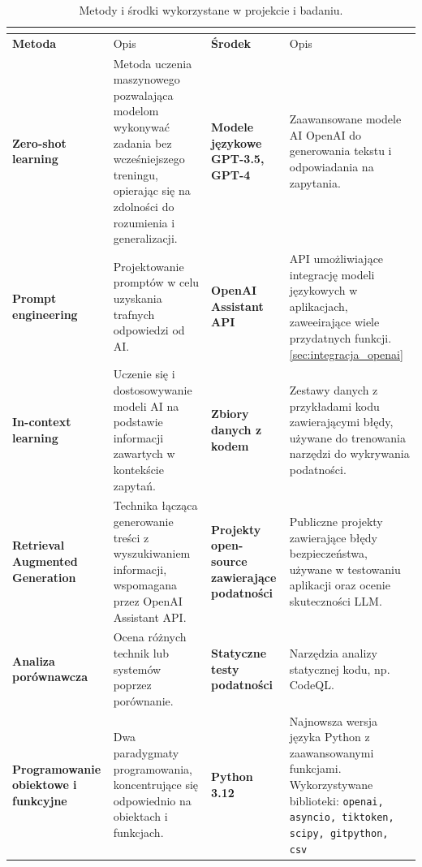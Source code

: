 \begin{table}[H]
    \caption{Metody i środki wykorzystane w projekcie i badaniu.}
    \begin{adjustwidth}{-2cm}{-2cm}  %
        \centering
    \begin{tabular}{|>{\bfseries}p{2.7cm}|p{5cm}|>{\bfseries}p{2.5cm}|p{5cm}|}
    \hline
    \multicolumn{4}{|c|}{\textbf{Metody i Środki}} \\
    \hline
    \textbf{Metoda} & \small{Opis} & \textbf{Środek} & \small{Opis} \\
    \hline
    \textbf{Zero-shot learning} & \small{Metoda uczenia maszynowego pozwalająca modelom wykonywać zadania bez wcześniejszego treningu, opierając się na zdolności do rozumienia i generalizacji.} & \textbf{Modele językowe GPT-3.5, GPT-4} & \small{Zaawansowane modele AI OpenAI do generowania tekstu i odpowiadania na zapytania.} \\
    \hline
    \textbf{Prompt engineering} & \small{Projektowanie promptów w celu uzyskania trafnych odpowiedzi od AI.} & \textbf{OpenAI Assistant API} & \small{API umożliwiające integrację modeli językowych w aplikacjach, zaweeirające wiele przydatnych funkcji.\ref{sec:integracja_openai}} \\
    \hline
    \textbf{In-context learning} & \small{Uczenie się i dostosowywanie modeli AI na podstawie informacji zawartych w kontekście zapytań.} & \textbf{Zbiory danych z kodem} & \small{Zestawy danych z przykładami kodu zawierającymi błędy, używane do trenowania narzędzi do wykrywania podatności.} \\
    \hline
    \textbf{Retrieval Augmented Generation} & \small{Technika łącząca generowanie treści z wyszukiwaniem informacji, wspomagana przez OpenAI Assistant API.} & \textbf{Projekty open-source zawierające podatności} & \small{Publiczne projekty zawierające błędy bezpieczeństwa, używane w testowaniu aplikacji oraz ocenie skuteczności LLM.} \\
    \hline
    \textbf{Analiza porównawcza} & \small{Ocena różnych technik lub systemów poprzez porównanie.} & \textbf{Statyczne testy podatności} & \small{Narzędzia analizy statycznej kodu, np. CodeQL.} \\
    \hline
    \textbf{Programowanie obiektowe i funkcyjne} & \small{Dwa paradygmaty programowania, koncentrujące się odpowiednio na obiektach i funkcjach.} & \textbf{Python 3.12} & \small{Najnowsza wersja języka Python z zaawansowanymi funkcjami. Wykorzystywane biblioteki: \texttt{openai, asyncio, tiktoken, scipy, gitpython, csv}} \\
    \hline
 \end{tabular}
\end{adjustwidth}
    \label{tab:methods_tools}
\end{table}
